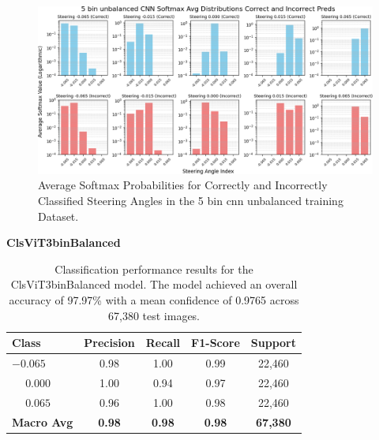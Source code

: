 \begin{figure}[H]
    \centering
    \includegraphics[width=1\linewidth]{Figures/Results/5_bins_cnn_softmax_dist_plot_unbalanced.png}
    \caption{Average Softmax Probabilities for Correctly and Incorrectly Classified Steering Angles in the 5 bin cnn unbalanced training Dataset.}
    \label{fig:5_bins_cnn_softmax_dist_unbalanced}
\end{figure}


\textbf{ClsViT3binBalanced}

\begin{table}[htbp]
\centering
\begin{tabular}{@{}lcccc@{}}
\toprule
\textbf{Class} & \textbf{Precision} & \textbf{Recall} & \textbf{F1-Score} & \textbf{Support} \\
\midrule
$-0.065$ & 0.98 & 1.00 & 0.99 & 22,460 \\
$\phantom{-}0.000$ & 1.00 & 0.94 & 0.97 & 22,460 \\
$\phantom{-}0.065$ & 0.96 & 1.00 & 0.98 & 22,460 \\
\midrule
\textbf{Macro Avg} & \textbf{0.98} & \textbf{0.98} & \textbf{0.98} & \textbf{67,380} \\
\bottomrule
\end{tabular}
\caption{Classification performance results for the ClsViT3binBalanced model. The model achieved an overall accuracy of 97.97\% with a mean confidence of 0.9765 across 67,380 test images.}
\label{tab:clf_report_ClsViT3binBalanced}
\end{table}

